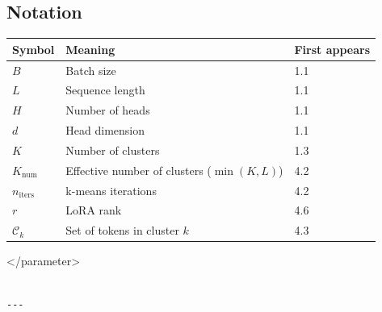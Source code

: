 \subsection{Notation}

\begin{table}[H]
\centering
\small
\begin{tabular}{lll}
\toprule
\textbf{Symbol} & \textbf{Meaning} & \textbf{First appears} \\
\midrule
$B$ & Batch size & 1.1 \\
$L$ & Sequence length & 1.1 \\
$H$ & Number of heads & 1.1 \\
$d$ & Head dimension & 1.1 \\
$K$ & Number of clusters & 1.3 \\
$K_{\text{num}}$ & Effective number of clusters ($\min(K, L)$) & 4.2 \\
$n_{\text{iters}}$ & k-means iterations & 4.2 \\
$r$ & LoRA rank & 4.6 \\
$\mathcal{C}_k$ & Set of tokens in cluster $k$ & 4.3 \\
\bottomrule
\end{tabular}
\end{table}
</parameter>
\begin{lstlisting}

---
\end{lstlisting}